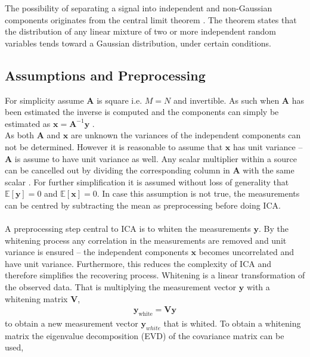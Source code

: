 The possibility of separating a signal into independent and non-Gaussian components originates from the central limit theorem \cite[p. 34]{ICA}. 
The theorem states that the distribution of any linear mixture of two or more independent random variables tends toward a Gaussian distribution, under certain conditions. 

\subsection{Assumptions and Preprocessing}
For simplicity assume $\mathbf{A}$ is square i.e. $M = N$ and invertible. 
As such when $\mathbf{A}$ has been estimated the inverse is computed and the components can simply be estimated as $\mathbf{x} = \mathbf{A}^{-1} \mathbf{y}$ \cite[p. 152-153]{ICA}.
\\ 
As both $\mathbf{A}$ and $\mathbf{x}$ are unknown the variances of the independent components can not be determined. 
However it is reasonable to assume that $\mathbf{x}$ has unit variance -- $\mathbf{A}$ is assume to have unit variance as well. 
Any scalar multiplier within a source can be cancelled out by dividing the corresponding column in $\mathbf{A}$ with the same scalar \cite[p. 154]{ICA}.
For further simplification it is assumed without loss of generality that $\mathbb{E}[\mathbf{y}] = 0$ and $\mathbb{E}[\mathbf{x}] = 0$\cite[p. 154]{ICA}. 
In case this assumption is not true, the measurements can be centred by subtracting the mean as preprocessing before doing ICA.
\\ \\
A preprocessing step central to ICA is to whiten the measurements $\mathbf{y}$. 
By the whitening process any correlation in the measurements are removed and unit variance is ensured -- the independent components $\mathbf{x}$ becomes uncorrelated and have unit variance. 
Furthermore, this reduces the complexity of ICA and therefore simplifies the recovering process.
Whitening is a linear transformation of the observed data. 
That is multiplying the measurement vector $\textbf{y}$ with a whitening matrix $\textbf{V}$,
\begin{align*}
\textbf{y}_{\text{white}} = \textbf{V}\textbf{y}
\end{align*} 
to obtain a new measurement vector $\textbf{y}_{white}$ that is whited. 
To obtain a whitening matrix the eigenvalue decomposition (EVD) of the covariance matrix can be used,
